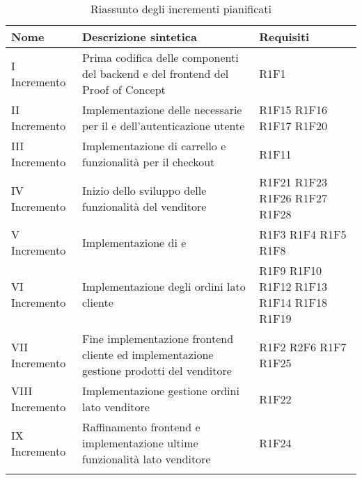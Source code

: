 \begin{center}
	\begin{longtable}{|p{2.5cm}|p{6.5cm}|p{6cm}|}
		\hline
		\rowcolor{lighter-grayer}
		\textbf{Nome}  & \textbf{Descrizione sintetica}                                                & \textbf{Requisiti} \\
		\hline
		\endfirsthead
		\hline
		\hline
		\endfoot
		\endlastfoot
		\hline
		I Incremento   & Prima codifica delle componenti del backend e del frontend del Proof of Concept & R1F1 \\
		II Incremento  & Implementazione delle \glock{API} necessarie per il \glock{PoC} e dell'autenticazione utente & R1F15 R1F16 R1F17 R1F20  \\
		III Incremento & Implementazione di carrello e funzionalità per il checkout   & R1F11 \\
		IV Incremento  & Inizio dello sviluppo delle funzionalità del venditore & R1F21 R1F23 R1F26 R1F27 R1F28          \\
		V Incremento   & Implementazione di \glock{PLP} e \glock{PDP}  & R1F3 R1F4 R1F5 R1F8 \\
		VI Incremento   & Implementazione degli ordini lato cliente   & R1F9 R1F10 R1F12 R1F13 R1F14 R1F18 R1F19 \\
		VII Incremento   & Fine implementazione frontend cliente ed implementazione gestione prodotti del venditore     &  R1F2     R2F6 R1F7 R1F25 \\
		VIII Incremento   & Implementazione gestione ordini lato venditore & R1F22    \\
		IX Incremento   & Raffinamento frontend e implementazione ultime funzionalità lato venditore & R1F24     \\
		
		 \hline
		\rowcolor{white}
		\caption{Riassunto degli incrementi pianificati}
	\end{longtable}
\end{center}